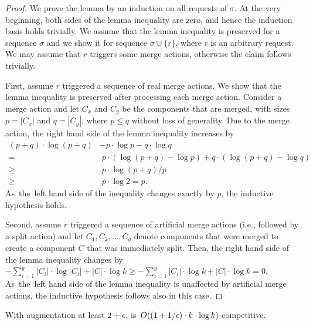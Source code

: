 \begin{proof}
We prove the lemma by an induction on all requests of $\sigma$. At the very
beginning, both sides of the lemma inequality are zero, and hence the induction
basis holds trivially. We assume that the lemma inequality is preserved for a
sequence $\sigma$ and we show it for sequence $\sigma \cup \{ r \}$, where $r$
is an arbitrary request. We may assume that $r$ triggers some merge actions,
otherwise the claim follows trivially.

First, assume $r$ triggered a sequence of real merge actions. We show that the
lemma inequality is preserved after processing each merge action. Consider a
merge action and let $C_x$ and $C_y$ be the components that are merged, with
sizes $p = |C_x|$ and $q = |C_y|$, where $p \leq q$ without loss of generality.
Due to the merge action, the right hand side of the lemma inequality increases
by
\begin{align*}
  (p + q) \cdot \log (p + q) & - p \cdot \log p - q \cdot \log q \\
		= &\; p \cdot (\log (p+q) - \log p) + q \cdot (\log (p+q) - \log q) \\
		\geq &\; p \cdot \log (p+q) / p \\
		\geq &\; p \cdot \log 2 = p.
\end{align*}
As~the~left hand side of the inequality changes exactly by $p$, the inductive
hypothesis holds.

Second, assume $r$ triggered a sequence of artificial merge actions (i.e., followed by a
split action) and let $C_1, C_2, \ldots, C_g$ denote components that were
merged to create a component $C$ that was immediately split. Then, the right
hand side of the lemma inequality changes by $- \sum_{i = 1}^g |C_i| \cdot
\log |C_i| + |C| \cdot \log k
\geq - \sum_{i = 1}^g |C_i| \cdot \log k + |C| \cdot \log k = 0$.
As~the~left hand side of the lemma inequality is unaffected by artificial
merge actions, the inductive hypothesis follows also in this case.
\end{proof}


\begin{theorem}
With augmentation at least $2+\epsilon$, \CREP is~$O((1 + 1/\epsilon) \cdot k \cdot \log k)$-competitive.
\end{theorem}

